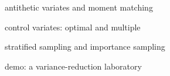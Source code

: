 \begin{planned}
  \item antithetic variates and moment matching
  \item control variates: optimal and multiple
  \item stratified sampling and importance sampling
  \item demo: a variance-reduction laboratory
\end{planned}
